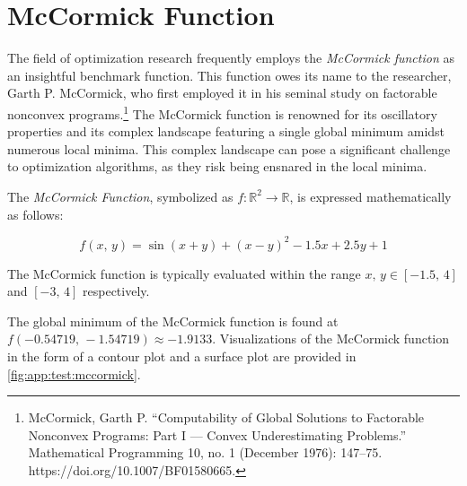 \section{McCormick Function}
\label{sec:app:test:mccormick}

  The field of optimization research frequently employs the \emph{McCormick
  function} as an insightful benchmark function. This function owes its name to
  the researcher, Garth P. McCormick, who first employed it in his seminal study
  on factorable nonconvex programs.\footnote{%
    McCormick, Garth P. \enquote{Computability of Global Solutions to Factorable
    Nonconvex Programs: Part I — Convex Underestimating Problems.}
    Mathematical Programming 10, no. 1 (December 1976): 147–75.
    https://doi.org/10.1007/BF01580665.
  }
  The McCormick function is renowned for its oscillatory properties and its
  complex landscape featuring a single global minimum amidst numerous local
  minima.
  This complex landscape can pose a significant challenge to optimization
  algorithms, as they risk being ensnared in the local minima.

  \begin{definition}
    The \emph{McCormick Function}, symbolized as \(f: \mathbb{R}^2 \rightarrow 
    \mathbb{R}\), is expressed mathematically as follows:

    \begin{equation}
      \label{eq:app:test:mccormick}
      f(x,\, y) = \sin(x + y) + (x - y)^2 - 1.5x + 2.5y + 1
    \end{equation}

    The McCormick function is typically evaluated within the range \(x,\, y \in
    [-1.5,\,4]\) and \([-3,\,4]\) respectively.
  \end{definition}

  The global minimum of the McCormick function is found at \(f(-0.54719,\,
  -1.54719) \approx -1.9133\). 
  Visualizations of the McCormick function in the form of a contour plot and
  a surface plot are provided in \vref{fig:app:test:mccormick}.

